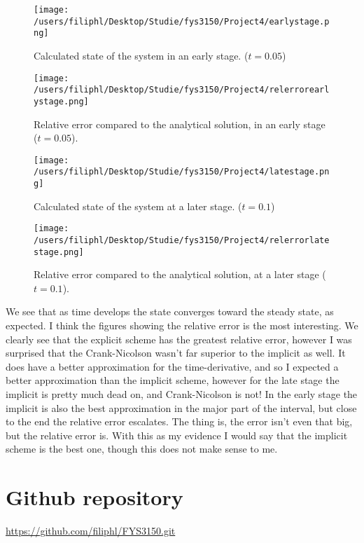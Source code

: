 \documentclass[norsk, a4paper]{article}
\begin{document}
\begin{minipage}[t]{0.48\linewidth}
\begin{figure}[H]
  \begin{center}
  \texttt{[image: /users/filiphl/Desktop/Studie/fys3150/Project4/earlystage.png]}
  \caption{Calculated state of the system in an early stage. ($t=0.05$)}\label{fig:fig1}
  \end{center}
\end{figure}
\end{minipage}
\quad
\begin{minipage}[t]{0.48\linewidth}
\begin{figure}[H]
  \begin{center}
  \texttt{[image: /users/filiphl/Desktop/Studie/fys3150/Project4/relerrorearlystage.png]}
  \caption{Relative error compared to the analytical solution, in an early stage ($t=0.05$).}\label{fig:fig1}
  \end{center}
\end{figure}
\end{minipage}

\begin{minipage}[t]{0.48\linewidth}
\begin{figure}[H]
  \begin{center}
  \texttt{[image: /users/filiphl/Desktop/Studie/fys3150/Project4/latestage.png]}
  \caption{Calculated state of the system at a later stage. ($t=0.1$)}\label{fig:fig1}
  \end{center}
\end{figure}
\end{minipage}
\quad
\begin{minipage}[t]{0.48\linewidth}
\begin{figure}[H]
  \begin{center}
  \texttt{[image: /users/filiphl/Desktop/Studie/fys3150/Project4/relerrorlatestage.png]}
  \caption{Relative error compared to the analytical solution, at a later stage ($t=0.1$).}\label{fig:fig1}
  \end{center}
\end{figure}
\end{minipage}

We see that as time develops the state converges toward the steady state, as expected. I think the figures showing the relative error is the most interesting. We clearly see that the explicit scheme has the greatest relative error, however I was surprised that the Crank-Nicolson wasn't far superior to the implicit as well. It does have a better approximation for the time-derivative, and so I expected a better approximation than the implicit scheme, however for the late stage the implicit is pretty much dead on, and Crank-Nicolson is not! In the early stage the implicit is also the best approximation in the major part of the interval, but close to the end the relative error escalates. The thing is, the error isn't even that big, but the relative error is. With this as my evidence I would say that the implicit scheme is the best one, though this does not make sense to me. 

\section{Github repository}
\url{https://github.com/filiphl/FYS3150.git}
\end{document}

